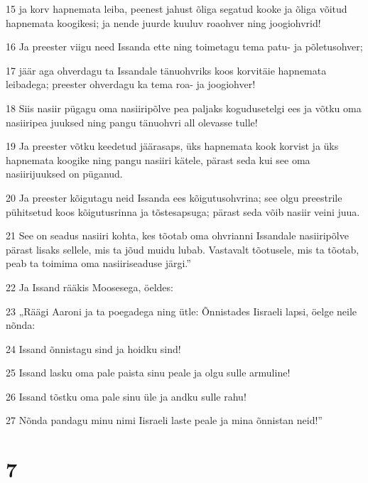 \par 15 ja korv hapnemata leiba, peenest jahust õliga segatud kooke ja õliga võitud hapnemata koogikesi; ja nende juurde kuuluv roaohver ning joogiohvrid!
\par 16 Ja preester viigu need Issanda ette ning toimetagu tema patu- ja põletusohver;
\par 17 jäär aga ohverdagu ta Issandale tänuohvriks koos korvitäie hapnemata leibadega; preester ohverdagu ka tema roa- ja joogiohver!
\par 18 Siis nasiir pügagu oma nasiiripõlve pea paljaks kogudusetelgi ees ja võtku oma nasiiripea juuksed ning pangu tänuohvri all olevasse tulle!
\par 19 Ja preester võtku keedetud jäärasaps, üks hapnemata kook korvist ja üks hapnemata koogike ning pangu nasiiri kätele, pärast seda kui see oma nasiirijuuksed on püganud.
\par 20 Ja preester kõigutagu neid Issanda ees kõigutusohvrina; see olgu preestrile pühitsetud koos kõigutusrinna ja tõstesapsuga; pärast seda võib nasiir veini juua.
\par 21 See on seadus nasiiri kohta, kes tõotab oma ohvrianni Issandale nasiiripõlve pärast lisaks sellele, mis ta jõud muidu lubab. Vastavalt tõotusele, mis ta tõotab, peab ta toimima oma nasiiriseaduse järgi.”
\par 22 Ja Issand rääkis Moosesega, öeldes:
\par 23 „Räägi Aaroni ja ta poegadega ning ütle: Õnnistades Iisraeli lapsi, öelge neile nõnda:
\par 24 Issand õnnistagu sind ja hoidku sind!
\par 25 Issand lasku oma pale paista sinu peale ja olgu sulle armuline!
\par 26 Issand tõstku oma pale sinu üle ja andku sulle rahu!
\par 27 Nõnda pandagu minu nimi Iisraeli laste peale ja mina õnnistan neid!”

\chapter{7}

